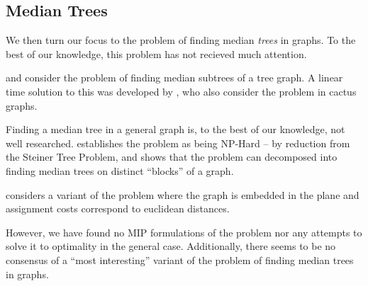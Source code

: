  \subsection{Median Trees}
 We then turn our focus to the problem of finding median \textit{trees} in graphs.
  To the best of our knowledge, this problem has not recieved much attention.

  \citet{minieka1985optimal} and \citet{george2003bi} consider the problem of finding
  median subtrees of a tree graph.
  A linear time solution to this was developed by
  \citet{kim1991locating}, who also consider the problem in cactus graphs.

  Finding a median tree in a general graph is, to the best of our knowledge, not well researched.
 \citet{aneja1992location} establishes the
  problem as being NP-Hard -- by reduction from the Steiner Tree Problem, and shows that the problem can
  decomposed into finding median trees on distinct ``blocks'' of a graph.

  \citet{kim1991locating} considers a variant of the problem where the graph is embedded in the plane
  and assignment costs correspond to euclidean distances.
  
  However, we have found no MIP formulations of the problem nor any attempts to solve it to optimality
  in the general case. Additionally, there seems to be no consensus of a ``most interesting'' variant
  of the problem of finding median trees in graphs.

  


